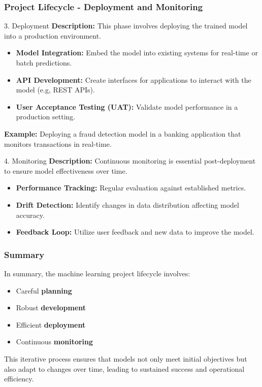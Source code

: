 \documentclass[aspectratio=169]{beamer}
\begin{document}
\begin{frame}[fragile]
    \frametitle{Project Lifecycle - Deployment and Monitoring}
    \begin{block}{3. Deployment}
        \textbf{Description:} This phase involves deploying the trained model into a production environment.
        \begin{itemize}
            \item \textbf{Model Integration:} Embed the model into existing systems for real-time or batch predictions.
            \item \textbf{API Development:} Create interfaces for applications to interact with the model (e.g, REST APIs).
            \item \textbf{User Acceptance Testing (UAT):} Validate model performance in a production setting.
        \end{itemize}

        \textbf{Example:} Deploying a fraud detection model in a banking application that monitors transactions in real-time.
    \end{block}

    \begin{block}{4. Monitoring}
        \textbf{Description:} Continuous monitoring is essential post-deployment to ensure model effectiveness over time.
        \begin{itemize}
            \item \textbf{Performance Tracking:} Regular evaluation against established metrics.
            \item \textbf{Drift Detection:} Identify changes in data distribution affecting model accuracy.
            \item \textbf{Feedback Loop:} Utilize user feedback and new data to improve the model.
        \end{itemize}
    \end{block}
\end{frame}

\begin{frame}[fragile]
    \frametitle{Summary}
    In summary, the machine learning project lifecycle involves:
    \begin{itemize}
        \item Careful \textbf{planning}
        \item Robust \textbf{development}
        \item Efficient \textbf{deployment}
        \item Continuous \textbf{monitoring}
    \end{itemize}
    This iterative process ensures that models not only meet initial objectives but also adapt to changes over time, leading to sustained success and operational efficiency.
\end{frame}
\end{document}
